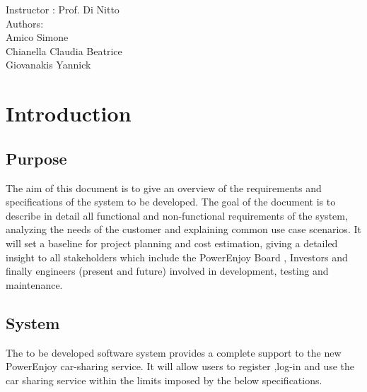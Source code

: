 \documentclass[12pt]{article}
\begin{document}
	\begin{center}
	 	{\Large Instructor : Prof. Di Nitto}
	 	 \vspace{5mm}\\	 
	 	{\Large Authors:}\\
	 	{\Large Amico Simone}\\
	 	{\Large Chianella Claudia Beatrice}\\
	 	{\Large Giovanakis Yannick}
	\end{center}
	 
	\newpage
	
	
	\tableofcontents{}
	 
	\newpage
	 
	\section{\Large Introduction}
	 
	 \subsection{Purpose}
		The aim of this document	is to give an overview of the requirements and 			
		specifications of the system to be developed. 
		The goal of the document is to describe in detail all functional and non-functional 
		requirements of the system, analyzing the needs of the customer and explaining common 
		use case scenarios.
		It will set a baseline for project planning and cost estimation, giving a detailed 
		insight to all stakeholders which include the PowerEnjoy Board , Investors and finally
	    engineers (present and future) involved  in development, testing and maintenance.
		
	 \subsection{System}
	 	The to be developed software system provides a complete support to the new PowerEnjoy 	
	 	car-sharing service. It will allow users to register ,log-in and use the car sharing 
	 	service within the limits imposed by the below specifications.
	 
	
\end{document}
